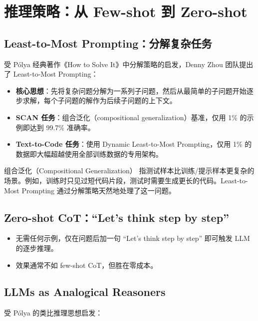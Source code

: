 \section{推理策略：从 Few-shot 到 Zero-shot}

\subsection{Least-to-Most Prompting：分解复杂任务}

受 P\'{o}lya 经典著作《How to Solve It》中分解策略的启发，Denny Zhou 团队提出了 Least-to-Most Prompting：

\begin{itemize}
    \item \textbf{核心思想}：先将复杂问题分解为一系列子问题，然后从最简单的子问题开始逐步求解，每个子问题的解作为后续子问题的上下文。
    \item \textbf{SCAN 任务}：组合泛化（compositional generalization）基准，仅用 1\% 的示例即达到 99.7\% 准确率。
    \item \textbf{Text-to-Code 任务}：使用 Dynamic Least-to-Most Prompting，仅用 1\% 的数据即大幅超越使用全部训练数据的专用架构。
\end{itemize}

\begin{knowledgebox}{组合泛化（Compositional Generalization）}
指测试样本比训练/提示样本更复杂的场景。例如，训练时只见过短代码片段，测试时需要生成更长的代码。Least-to-Most Prompting 通过分解策略天然地处理了这一问题。
\end{knowledgebox}

\subsection{Zero-shot CoT：``Let's think step by step''}

\begin{itemize}
    \item 无需任何示例，仅在问题后加一句 ``Let's think step by step'' 即可触发 LLM 的逐步推理。
    \item 效果通常不如 few-shot CoT，但胜在零成本。
\end{itemize}

\subsection{LLMs as Analogical Reasoners}

受 P\'{o}lya 的类比推理思想启发：

